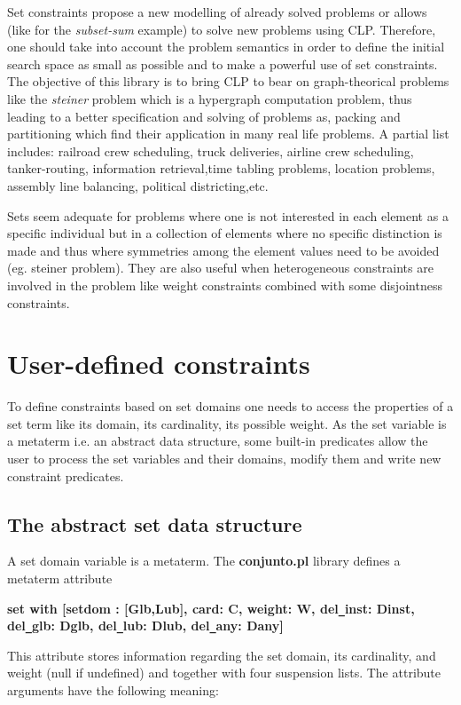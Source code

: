 Set constraints propose a new modelling of already solved problems or
allows (like for the {\em subset-sum} example) to solve new problems
using CLP. Therefore, one should take into account the problem
semantics in order to define the initial search space as small as
possible and to make a powerful use of set constraints. The objective
of this library is to bring CLP to bear on graph-theorical problems
like the {\em steiner} problem which is a hypergraph computation
problem, thus leading to a better specification and solving of
problems as, packing and partitioning which find their application in
many real life problems.  A partial list includes: railroad crew
scheduling, truck deliveries, airline crew scheduling, tanker-routing,
information retrieval,time tabling problems, location problems,
assembly line balancing, political districting,etc.

Sets seem adequate for problems where one is not interested in each
element as a specific individual but in a collection of elements where
no specific distinction is made and thus where symmetries among the
element values need to be avoided (eg. steiner problem). They are also
useful when heterogeneous constraints are involved in the problem like
weight constraints combined with some disjointness constraints.
\section{User-defined constraints}

To define constraints based on set domains one needs to
access the properties of a set term like its domain, its cardinality,
its possible weight. As the set variable is a metaterm i.e. an
abstract data structure, some built-in predicates allow the user to
process the set variables and their domains, modify them and write new
constraint predicates. 

\subsection{The abstract set data structure}
A set domain variable is a metaterm. The {\bf conjunto.pl} library
defines a metaterm attribute

{\bf set with [setdom : [Glb,Lub], card: C, weight: W, del\verb/_/inst: Dinst,
del\verb/_/glb: Dglb, del\verb/_/lub: Dlub, del\verb/_/any: Dany]}

This attribute stores information regarding the set domain, its
cardinality, and weight (null if undefined) and together with four
suspension lists. The attribute arguments have the following meaning:


